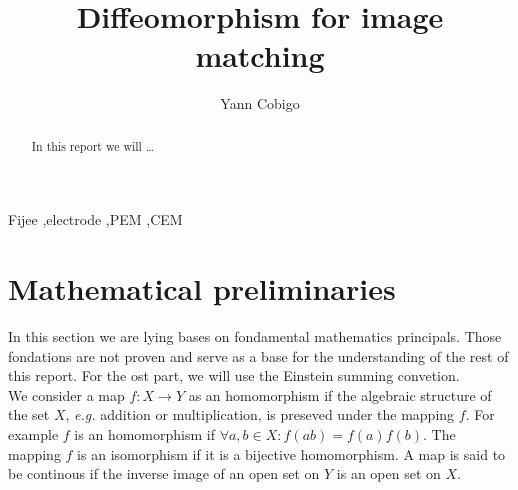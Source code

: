 \documentclass[final, paper=letter,5p,times,twocolumn]{elsarticle}
\theoremstyle{definition}
\begin{document}
\begin{frontmatter}

\title{Diffeomorphism for image matching}

\author[label1]{Yann Cobigo}
\address[label1]{University of California, San Francisco | ucsf.edu}




\begin{abstract}
In this report we will \dots
\end{abstract}

\begin{keyword}
Fijee \sep electrode \sep PEM \sep CEM
\end{keyword}

\end{frontmatter}


\section{Mathematical preliminaries}

In this section we are lying bases on fondamental mathematics principals. Those fondations are not proven and serve as a base for the understanding of the rest of this report. For the ost part, we will use the Einstein summing convetion.\\
We consider a map $f: X \rightarrow Y$ as an homomorphism if the algebraic structure of the set $X$, {\it e.g.} addition or multiplication, is preseved under the mapping $f$. For example $f$ is an homomorphism if $\forall a,b \in X: f(ab) = f(a)f(b)$. The mapping $f$ is an isomorphism if it is a bijective homomorphism. A map is said to be continous if the inverse image of an open set on $Y$ is an open set on $X$.
\end{document}
